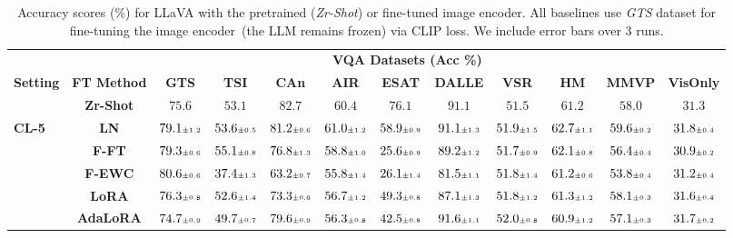 \begin{table}
\caption{Accuracy scores (\%) for LLaVA with the pretrained (\emph{Zr-Shot}) or fine-tuned image encoder. All baselines use \emph{GTS} dataset for fine-tuning the image encoder~(the LLM remains frozen) via CLIP loss. We include error bars over 3 runs.}
 \label{table:vlm_vqa_acc_gtsrb_clip}
\vskip 0.15in
\begin{center}
\begin{small}
\begingroup
\setlength{\tabcolsep}{3.9pt}
\begin{tabular}{l c c c c c c c c c c c}
\toprule
 & & \multicolumn{9}{c}{\textbf{VQA Datasets (Acc \%)}}  \\
\cmidrule(lr){3-12}
\textbf{Setting} & \textbf{FT Method}  & \textbf{GTS} & \textbf{TSI} & \textbf{CAn} & \textbf{AIR} & \textbf{ESAT} & \textbf{DALLE} & \textbf{VSR} & \textbf{HM} & \textbf{MMVP} & \textbf{VisOnly} \\
\midrule
 & \textbf{Zr-Shot} & $75.6$ & $53.1$ & $82.7$ & $60.4$ & $76.1$ & $91.1$ & $51.5$ & $61.2$ & $58.0$ & $31.3$ \\
\midrule
\multirow{7}{*}{\textbf{CL-5}} & \textbf{LN} & $79.1 \mbox{\tiny\ensuremath{\pm 1.2}}$ & $53.6 \mbox{\tiny\ensuremath{\pm 0.5}}$ & $81.2 \mbox{\tiny\ensuremath{\pm 0.6}}$ & $61.0 \mbox{\tiny\ensuremath{\pm 1.2}}$ & $58.9 \mbox{\tiny\ensuremath{\pm 0.9}}$ & $91.1 \mbox{\tiny\ensuremath{\pm 1.3}}$ & $51.9 \mbox{\tiny\ensuremath{\pm 1.5}}$ & $62.7 \mbox{\tiny\ensuremath{\pm 1.1}}$ & $59.6 \mbox{\tiny\ensuremath{\pm 0.2}}$ & $31.8 \mbox{\tiny\ensuremath{\pm 0.4}}$ \\
& \textbf{F-FT} & $79.3 \mbox{\tiny\ensuremath{\pm 0.6}}$ & $55.1 \mbox{\tiny\ensuremath{\pm 0.8}}$ & $76.8 \mbox{\tiny\ensuremath{\pm 1.3}}$ & $58.8 \mbox{\tiny\ensuremath{\pm 1.0}}$ & $25.6 \mbox{\tiny\ensuremath{\pm 0.9}}$ & $89.2 \mbox{\tiny\ensuremath{\pm 1.2}}$ & $51.7 \mbox{\tiny\ensuremath{\pm 0.9}}$ & $62.1 \mbox{\tiny\ensuremath{\pm 0.8}}$ & $56.4 \mbox{\tiny\ensuremath{\pm 0.4}}$ & $30.9 \mbox{\tiny\ensuremath{\pm 0.2}}$ \\
& \textbf{F-EWC} & $80.6 \mbox{\tiny\ensuremath{\pm 0.6}}$ & $37.4 \mbox{\tiny\ensuremath{\pm 1.3}}$ & $63.2 \mbox{\tiny\ensuremath{\pm 0.7}}$ & $55.8 \mbox{\tiny\ensuremath{\pm 1.4}}$ & $26.1 \mbox{\tiny\ensuremath{\pm 1.4}}$ & $81.5 \mbox{\tiny\ensuremath{\pm 1.1}}$ & $51.8 \mbox{\tiny\ensuremath{\pm 1.4}}$ & $61.2 \mbox{\tiny\ensuremath{\pm 0.6}}$ & $53.8 \mbox{\tiny\ensuremath{\pm 0.4}}$ & $31.2 \mbox{\tiny\ensuremath{\pm 0.4}}$ \\
& \textbf{LoRA} & $76.3 \mbox{\tiny\ensuremath{\pm 0.8}}$ & $52.6 \mbox{\tiny\ensuremath{\pm 1.4}}$ & $73.3 \mbox{\tiny\ensuremath{\pm 0.6}}$ & $56.7 \mbox{\tiny\ensuremath{\pm 1.2}}$ & $49.3 \mbox{\tiny\ensuremath{\pm 0.8}}$ & $87.1 \mbox{\tiny\ensuremath{\pm 1.3}}$ & $51.8 \mbox{\tiny\ensuremath{\pm 1.2}}$ & $61.3 \mbox{\tiny\ensuremath{\pm 1.2}}$ & $58.1 \mbox{\tiny\ensuremath{\pm 0.3}}$ & $31.6 \mbox{\tiny\ensuremath{\pm 0.4}}$ \\
& \textbf{AdaLoRA} & $74.7 \mbox{\tiny\ensuremath{\pm 0.9}}$ & $49.7 \mbox{\tiny\ensuremath{\pm 0.7}}$ & $79.6 \mbox{\tiny\ensuremath{\pm 0.9}}$ & $56.3 \mbox{\tiny\ensuremath{\pm 0.8}}$ & $42.5 \mbox{\tiny\ensuremath{\pm 0.8}}$ & $91.6 \mbox{\tiny\ensuremath{\pm 1.1}}$ & $52.0 \mbox{\tiny\ensuremath{\pm 0.8}}$ & $60.9 \mbox{\tiny\ensuremath{\pm 1.2}}$ & $57.1 \mbox{\tiny\ensuremath{\pm 0.3}}$ & $31.7 \mbox{\tiny\ensuremath{\pm 0.2}}$ \\

\end{tabular}
\end{small}
\end{center}
\end{table}
